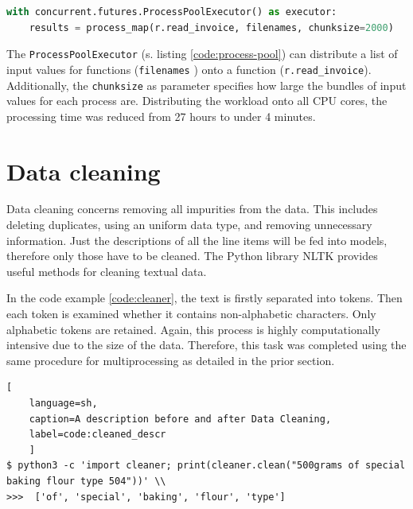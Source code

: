 \begin{lstlisting}[language=python, 
label=code:process-pool,
caption=Spawning a Process Pool in Python,
style=EigenerPythonStyle]   
with concurrent.futures.ProcessPoolExecutor() as executor:
	results = process_map(r.read_invoice, filenames, chunksize=2000)
\end{lstlisting}

	The \lstinline|ProcessPoolExecutor| (s. listing \ref{code:process-pool}) can distribute a list of input values for functions (\lstinline|filenames| ) onto a function (\lstinline|r.read_invoice|). Additionally, the \lstinline|chunksize| as parameter specifies how large the bundles of input values for each process are. Distributing the workload onto all \acs{CPU} cores, the processing time was reduced from 27 hours to under 4 minutes. 
	
	\section{Data cleaning}
	Data cleaning concerns removing all impurities from the data. This includes deleting duplicates, using an uniform data type, and removing unnecessary information.
	Just the descriptions of all the line items will be fed into models, therefore only those have to be cleaned. The Python library \ac{NLTK} provides useful methods for cleaning textual data.
	
	
	
	In the code example \ref{code:cleaner}, the text is firstly separated into tokens. Then each token is examined whether it contains non-alphabetic characters. Only alphabetic tokens are retained. Again, this process is highly computationally intensive due to the size of the data. Therefore, this task was completed using the same procedure for multiprocessing as detailed in the prior section.
	
\begin{lstlisting}[
	language=sh,
	caption=A description before and after Data Cleaning,
	label=code:cleaned_descr
	]
$ python3 -c 'import cleaner; print(cleaner.clean("500grams of special baking flour type 504"))' \\
>>>  ['of', 'special', 'baking', 'flour', 'type']
\end{lstlisting}
	 
